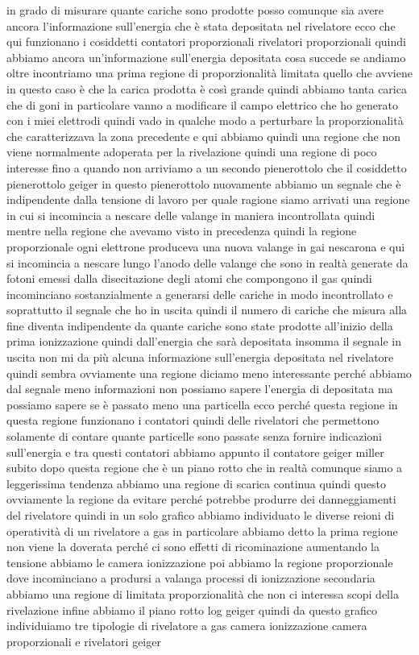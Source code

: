 {in grado di misurare quante cariche sono prodotte posso comunque sia avere ancora l'informazione sull'energia che è stata depositata nel rivelatore ecco che qui funzionano i cosiddetti contatori proporzionali rivelatori proporzionali quindi abbiamo ancora un'informazione sull'energia depositata cosa succede se andiamo oltre incontriamo una prima regione di proporzionalità limitata quello che avviene in questo caso è che la carica prodotta è così grande quindi abbiamo tanta carica che di goni in particolare vanno a modificare il campo elettrico che ho generato con i miei elettrodi quindi vado in qualche modo a perturbare la proporzionalità che caratterizzava la zona precedente e qui abbiamo quindi una regione che non viene normalmente adoperata per la rivelazione quindi una regione di poco interesse fino a quando non arriviamo a un secondo pienerottolo che il cosiddetto pienerottolo geiger in questo pienerottolo nuovamente abbiamo un segnale che è indipendente dalla tensione di lavoro per quale ragione siamo arrivati una regione in cui si incomincia a nescare delle valange in maniera incontrollata quindi mentre nella regione che avevamo visto in precedenza quindi la regione proporzionale ogni elettrone produceva una nuova valange in gai nescarona e qui si incomincia a nescare lungo l'anodo delle valange che sono in realtà generate da fotoni emessi dalla disecitazione degli atomi che compongono il gas quindi incominciano sostanzialmente a generarsi delle cariche in modo incontrollato e soprattutto il segnale che ho in uscita quindi il numero di cariche che misura alla fine diventa indipendente da quante cariche sono state prodotte all'inizio della prima ionizzazione quindi dall'energia che sarà depositata insomma il segnale in uscita non mi da più alcuna informazione sull'energia depositata nel rivelatore quindi sembra ovviamente una regione diciamo meno interessante perché abbiamo dal segnale meno informazioni non possiamo sapere l'energia di depositata ma possiamo sapere se è passato meno una particella ecco perché questa regione in questa regione funzionano i contatori quindi delle rivelatori che permettono solamente di contare quante particelle sono passate senza fornire indicazioni sull'energia e tra questi contatori abbiamo appunto il contatore geiger miller subito dopo questa regione che è un piano rotto che in realtà comunque siamo a leggerissima tendenza abbiamo una regione di scarica continua quindi questo ovviamente la regione da evitare perché potrebbe produrre dei danneggiamenti del rivelatore quindi in un solo grafico abbiamo individuato le diverse reioni di operatività di un rivelatore a gas in particolare abbiamo detto la prima regione non viene la doverata perché ci sono effetti di ricominazione aumentando la tensione abbiamo le camera ionizzazione poi abbiamo la regione proporzionale dove incominciano a prodursi a valanga processi di ionizzazione secondaria abbiamo una regione di limitata proporzionalità che non ci interessa scopi della rivelazione infine abbiamo il piano rotto log geiger quindi da questo grafico individuiamo tre tipologie di rivelatore a gas camera ionizzazione camera proporzionali e rivelatori geiger 

}
